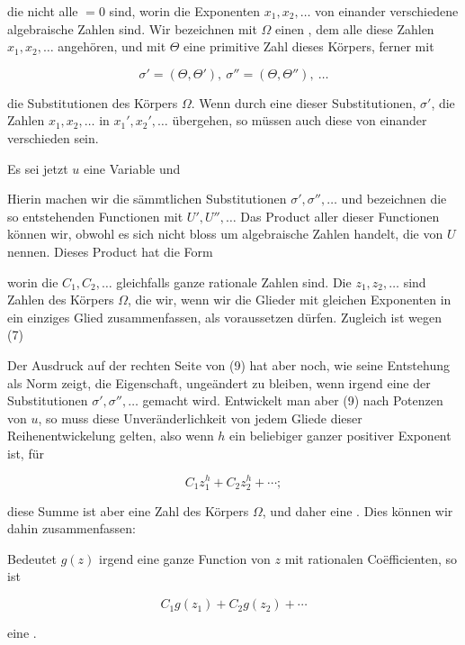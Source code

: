 die nicht alle $=0$ sind, worin die Exponenten $x_1, x_2, \ldots$ von einander verschiedene algebraische Zahlen sind. Wir bezeichnen mit $\Omega$ einen , dem alle diese Zahlen $x_1, x_2, \ldots$ angehören, und mit $\Theta$ eine primitive Zahl dieses Körpers, ferner mit

\[
\sigma' = (\Theta,\Theta'),\ \sigma'' = (\Theta,\Theta''),\ \ldots
\]

die Substitutionen des Körpers $\Omega$. Wenn durch eine dieser Substitutionen, $\sigma'$, die Zahlen $x_1, x_2, \ldots$ in $x_1', x_2', \ldots$ übergehen, so müssen auch diese von einander verschieden sein.

Es sei jetzt $u$ eine Variable und


Hierin machen wir die sämmtlichen Substitutionen $\sigma', \sigma'', \ldots$ und bezeichnen die so entstehenden Functionen mit $U', U'', \ldots$ Das Product aller dieser Functionen können wir, obwohl es sich nicht bloss um algebraische Zahlen handelt, die  von $U$ nennen. Dieses Product hat die Form


worin die $C_1, C_2, \ldots$ gleichfalls ganze rationale Zahlen sind. Die $z_1, z_2, \ldots$ sind Zahlen des Körpers $\Omega$, die wir, wenn wir die Glieder mit gleichen Exponenten in ein einziges Glied zusammenfassen, als  voraussetzen dürfen. Zugleich ist wegen (7)


Der Ausdruck auf der rechten Seite von (9) hat aber noch, wie seine Entstehung als Norm zeigt, die Eigenschaft, ungeändert zu bleiben, wenn irgend eine der Substitutionen $\sigma', \sigma'', \ldots$ gemacht wird. Entwickelt man aber (9) nach Potenzen von $u$, so muss diese Unveränderlichkeit von jedem Gliede dieser Reihenentwickelung gelten, also wenn $h$ ein beliebiger ganzer positiver Exponent ist, für

\[
C_1z_1^h+C_2z_2^h+\cdots;
\]

diese Summe ist aber eine Zahl des Körpers $\Omega$, und daher eine . Dies können wir dahin zusammenfassen:

Bedeutet $g(z)$ irgend eine ganze Function von $z$ mit rationalen Coëfficienten, so ist

\[
C_1g(z_1)+C_2g(z_2)+\cdots
\]

eine .
